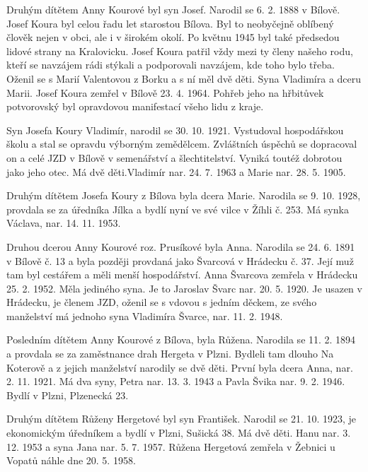\documentclass[../dejiny-rodu-prusiku.tex]{subfiles}
\begin{document}
Druhým dítětem Anny Kourové byl syn Josef. Narodil se 6. 2. 1888 v Bílově. Josef Koura byl celou řadu let starostou Bílova. Byl to neobyčejně oblíbený člověk nejen v obci, ale i v širokém okolí. Po květnu 1945 byl také předsedou lidové strany na Kralovicku. Josef Koura patřil vždy mezi ty členy našeho rodu, kteří se navzájem rádi stýkali a podporovali navzájem, kde toho bylo třeba. Oženil se s Marií Valentovou z Borku a s ní měl dvě děti. Syna Vladimíra a dceru Marii. Josef Koura zemřel v Bílově 23. 4. 1964. Pohřeb jeho na hřbitůvek potvorovský byl opravdovou manifestací všeho lidu z kraje.

Syn Josefa Koury Vladimír, narodil se 30. 10. 1921. Vystudoval hospodářskou školu a stal se opravdu výborným zemědělcem. Zvláštních úspěchů se dopracoval on a celé JZD v Bílově v semenářství a šlechtitelství. Vyniká tou­též dobrotou jako jeho otec. Má dvě děti.Vladimír nar. 24. 7. 1963 a Marie nar. 28. 5. 1905.

Druhým dítětem Josefa Koury z Bílova byla dcera Marie. Narodila se 9. 10. 1928, provdala se za úředníka Jílka a bydlí nyní ve své vilce v Žíhli č. 253. Má synka Václava, nar. 14. 11. 1953.

Druhou dcerou Anny Kourové roz. Prusíkové byla Anna. Narodila se 24. 6. 1891 v Bílově č. 13 a byla později provdaná jako Švarcová v Hrádecku č. 37. Její muž tam byl cestářem a měli menší hospodářství. Anna Švarcova zemřela v Hrádecku 25. 2. 1952. Měla jediného syna. Je to Jaroslav Švarc nar. 20. 5. 1920. Je usazen v Hrádecku, je členem JZD, oženil se s vdovou s jedním děckem, ze svého manželství má jednoho syna Vladimíra Švarce, nar. 11. 2. 1948.

Posledním dítětem Anny Kourové z Bílova, byla Růžena. Narodila se 11. 2. 1894 a provdala se za zaměstnance drah Hergeta v Plzni. Bydleli tam dlouho Na Koterově a z je­jich manželství narodily se dvě děti. První byla dcera Anna, nar. 2. 11. 1921. Má dva syny, Petra nar. 13. 3. 1943 a Pavla Švika nar. 9. 2. 1946. Bydlí v Plzni, Plzenecká 23.

Druhým dítětem Růženy Hergetové byl syn František. Narodil se 21. 10. 1923, je ekonomickým úředníkem a bydlí v Plzni, Sušická 38. Má dvě děti. Hanu nar. 3. 12. 1953 a syna Jana nar. 5. 7. 1957. Růžena Hergetová zemřela v Žebnici u Vopatů náhle dne 20. 5. 1958.
\end{document}

